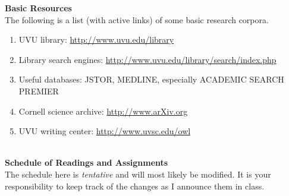 \documentclass[11pt]{article}
\begin{document}
  
  {\bf Basic Resources}\\
  The following is a list (with active links) of some basic research corpora.
  \begin{enumerate}
\item UVU library: \href{http://www.uvu.edu/library}{http://www.uvu.edu/library}
\item Library search engines: \href{http://www.uvu.edu/library/search/index.php}{http://www.uvu.edu/library/search/index.php}
\item Useful databases: JSTOR, MEDLINE, especially ACADEMIC SEARCH PREMIER
\item Cornell science archive: \href{http://www.arXiv.org}{http://www.arXiv.org}
\item UVU writing center: \href{http://www.uvsc.edu/owl}{http://www.uvsc.edu/owl}
\end{enumerate}
\ \\
% 
\newpage
   {\bf  Schedule of Readings and Assignments}\\
   The schedule here is {\it tentative} and will most likely be modified. It is your responsibility to keep track of the changes as I announce them in class.
\end{document}
